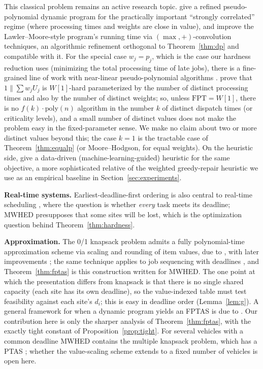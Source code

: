 \documentclass[pdflatex,sn-mathphys-ay]{sn-jnl}
\theoremstyle{thmstyleone}
\theoremstyle{thmstyletwo}
\theoremstyle{thmstylethree}
\begin{document}
This classical problem remains an active research topic.
\citet{hejl2022} give a refined pseudo-polynomial dynamic program for the
practically important ``strongly correlated'' regime (where processing
times and weights are close in value), and \citet{hermelin2024} improve
the Lawler--Moore-style program's running time via
$(\max,+)$-convolution techniques, an algorithmic refinement orthogonal
to Theorem~\ref{thm:dp} and compatible with it. For the special case
$w_j=p_j$, which is the case our hardness reduction uses (minimizing the
total processing time of late jobs), there is a fine-grained line of work
with near-linear pseudo-polynomial algorithms
\citep{bringmann2022,klein2023,fischer2025theoretics}.
\citet{heegerhermelin2024} prove that $1\|\sum w_jU_j$ is $W[1]$-hard
parameterized by the number of distinct processing times and also by the
number of distinct weights; so, unless $\mathrm{FPT}=W[1]$, there is no
$f(k)\cdot\mathrm{poly}(n)$ algorithm in the number $k$ of distinct
dispatch times (or criticality levels), and a small number of distinct
values does not make the problem easy in the fixed-parameter sense. We
make no claim about two or more distinct values beyond this; the case
$k=1$ is the tractable case of Theorem~\ref{thm:equalp} (or
Moore--Hodgson, for equal weights). On the heuristic side,
\citet{antonov2026} give a data-driven (machine-learning-guided) heuristic
for the same objective, a more sophisticated relative of the weighted
greedy-repair heuristic we use as an empirical baseline in
Section~\ref{sec:experiments}.

\textbf{Real-time systems.} Earliest-deadline-first ordering is also
central to real-time scheduling \citep{liulayland1973}, where the question
is whether \emph{every} task meets its deadline; MWHED presupposes that
some sites will be lost, which is the optimization question behind
Theorem~\ref{thm:hardness}.

\textbf{Approximation.} The 0/1 knapsack problem admits a fully
polynomial-time approximation scheme via scaling and rounding of item
values, due to \citet{ibarrakim1975}, with later improvements
\citep{lawler1979,kellerer1999,kellerer2004,jin2019,chen2025fptas}; the
same technique applies to job sequencing with deadlines
\citep{sahni1976,gensl1981}, and Theorem~\ref{thm:fptas} is this
construction written for MWHED. The one point at which the presentation
differs from knapsack is that there is no single shared capacity (each
site has its own deadline), so the value-indexed table must test
feasibility against each site's $d_i$; this is easy in deadline order
(Lemma~\ref{lem:g}). A general framework for when a dynamic program
yields an FPTAS is due to \citet{woeginger2000}. Our contribution here is
only the sharper analysis of Theorem~\ref{thm:fptas}, with the exactly
tight constant of Proposition~\ref{prop:tight}. For several vehicles
with a common deadline MWHED contains the multiple knapsack problem,
which has a PTAS \citep{chekuri2005}; whether the value-scaling scheme
extends to a fixed number of vehicles is open here.
\end{document}
